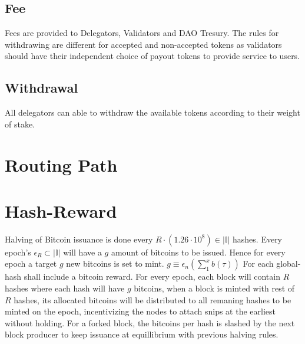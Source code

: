 \documentclass[a4paper,10pt]{article}
\begin{document}
\subsection{Fee}
Fees are provided to Delegators, Validators and DAO Tresury. The rules for withdrawing are different for accepted and non-accepted tokens as validators should have their independent choice of payout tokens to provide service to users.
\subsection{Withdrawal}
All delegators can able to withdraw the available tokens according to their weight of stake.

\section{Routing Path}

\section{Hash-Reward}
Halving of Bitcoin issuance is done every $R \cdot (1.26 \cdot 10^8) \in |\mathbb{I}|$ hashes. Every epoch's $ \epsilon_R \subset |\mathbb{I}|$ will have a $g$ amount of bitcoins to be issued. Hence for every epoch a target $g$ new bitcoins is set to mint. 
$g \equiv \epsilon_n(\sum_1^x b(\tau))$ For each global-hash shall include a bitcoin reward. For every epoch, each block will contain $R$ hashes where each hash will have $g$ bitcoins, when a block is minted with rest of $R$ hashes, its allocated bitcoins will be distributed to all remaning hashes to be minted on the epoch, incentivizing the nodes to attach snips at the earliest without holding. For a forked block, the bitcoins per hash is slashed by the next block producer to keep issuance at equillibrium with previous halving rules.
\end{document}
